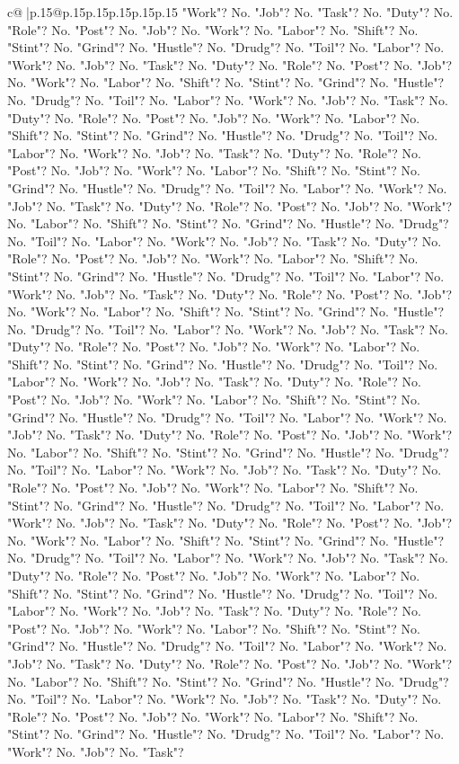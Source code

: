\documentclass{article}
\begin{document}
{\begin{supertabular}{c@{$\;$}|p{.15\linewidth}@{}p{.15\linewidth}p{.15\linewidth}p{.15\linewidth}p{.15\linewidth}p{.15\linewidth}}
{{{"Work"? No. "Job"? No. "Task"? No. "Duty"? No. "Role"? No. "Post"? No. "Job"? No. "Work"? No. "Labor"? No. "Shift"? No. "Stint"? No. "Grind"? No. "Hustle"? No. "Drudg"? No. "Toil"? No. "Labor"? No. "Work"? No. "Job"? No. "Task"? No. "Duty"? No. "Role"? No. "Post"? No. "Job"? No. "Work"? No. "Labor"? No. "Shift"? No. "Stint"? No. "Grind"? No. "Hustle"? No. "Drudg"? No. "Toil"? No. "Labor"? No. "Work"? No. "Job"? No. "Task"? No. "Duty"? No. "Role"? No. "Post"? No. "Job"? No. "Work"? No. "Labor"? No. "Shift"? No. "Stint"? No. "Grind"? No. "Hustle"? No. "Drudg"? No. "Toil"? No. "Labor"? No. "Work"? No. "Job"? No. "Task"? No. "Duty"? No. "Role"? No. "Post"? No. "Job"? No. "Work"? No. "Labor"? No. "Shift"? No. "Stint"? No. "Grind"? No. "Hustle"? No. "Drudg"? No. "Toil"? No. "Labor"? No. "Work"? No. "Job"? No. "Task"? No. "Duty"? No. "Role"? No. "Post"? No. "Job"? No. "Work"? No. "Labor"? No. "Shift"? No. "Stint"? No. "Grind"? No. "Hustle"? No. "Drudg"? No. "Toil"? No. "Labor"? No. "Work"? No. "Job"? No. "Task"? No. "Duty"? No. "Role"? No. "Post"? No. "Job"? No. "Work"? No. "Labor"? No. "Shift"? No. "Stint"? No. "Grind"? No. "Hustle"? No. "Drudg"? No. "Toil"? No. "Labor"? No. "Work"? No. "Job"? No. "Task"? No. "Duty"? No. "Role"? No. "Post"? No. "Job"? No. "Work"? No. "Labor"? No. "Shift"? No. "Stint"? No. "Grind"? No. "Hustle"? No. "Drudg"? No. "Toil"? No. "Labor"? No. "Work"? No. "Job"? No. "Task"? No. "Duty"? No. "Role"? No. "Post"? No. "Job"? No. "Work"? No. "Labor"? No. "Shift"? No. "Stint"? No. "Grind"? No. "Hustle"? No. "Drudg"? No. "Toil"? No. "Labor"? No. "Work"? No. "Job"? No. "Task"? No. "Duty"? No. "Role"? No. "Post"? No. "Job"? No. "Work"? No. "Labor"? No. "Shift"? No. "Stint"? No. "Grind"? No. "Hustle"? No. "Drudg"? No. "Toil"? No. "Labor"? No. "Work"? No. "Job"? No. "Task"? No. "Duty"? No. "Role"? No. "Post"? No. "Job"? No. "Work"? No. "Labor"? No. "Shift"? No. "Stint"? No. "Grind"? No. "Hustle"? No. "Drudg"? No. "Toil"? No. "Labor"? No. "Work"? No. "Job"? No. "Task"? No. "Duty"? No. "Role"? No. "Post"? No. "Job"? No. "Work"? No. "Labor"? No. "Shift"? No. "Stint"? No. "Grind"? No. "Hustle"? No. "Drudg"? No. "Toil"? No. "Labor"? No. "Work"? No. "Job"? No. "Task"? No. "Duty"? No. "Role"? No. "Post"? No. "Job"? No. "Work"? No. "Labor"? No. "Shift"? No. "Stint"? No. "Grind"? No. "Hustle"? No. "Drudg"? No. "Toil"? No. "Labor"? No. "Work"? No. "Job"? No. "Task"? No. "Duty"? No. "Role"? No. "Post"? No. "Job"? No. "Work"? No. "Labor"? No. "Shift"? No. "Stint"? No. "Grind"? No. "Hustle"? No. "Drudg"? No. "Toil"? No. "Labor"? No. "Work"? No. "Job"? No. "Task"? No. "Duty"? No. "Role"? No. "Post"? No. "Job"? No. "Work"? No. "Labor"? No. "Shift"? No. "Stint"? No. "Grind"? No. "Hustle"? No. "Drudg"? No. "Toil"? No. "Labor"? No. "Work"? No. "Job"? No. "Task"? No. "Duty"? No. "Role"? No. "Post"? No. "Job"? No. "Work"? No. "Labor"? No. "Shift"? No. "Stint"? No. "Grind"? No. "Hustle"? No. "Drudg"? No. "Toil"? No. "Labor"? No. "Work"? No. "Job"? No. "Task"? No. "Duty"? No. "Role"? No. "Post"? No. "Job"? No. "Work"? No. "Labor"? No. "Shift"? No. "Stint"? No. "Grind"? No. "Hustle"? No. "Drudg"? No. "Toil"? No. "Labor"? No. "Work"? No. "Job"? No. "Task"? }}}
\end{supertabular}}
\end{document}

